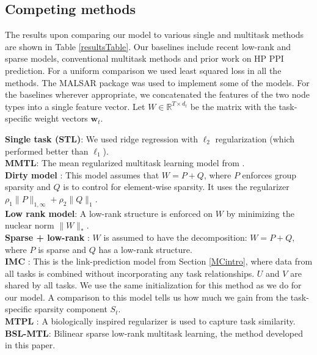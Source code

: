\documentclass[runningheads,a4paper]{llncs}
\begin{document}
\subsection{Competing methods}
The results upon comparing our model to various single and multitask methods are shown in Table \ref{resultsTable}. Our baselines include recent low-rank and sparse models, conventional multitask methods and prior work on HP PPI prediction. For a uniform comparison we used least squared loss in all the methods. The MALSAR package was used to implement some of the models. For the baselines wherever appropriate, we concatenated the features of the two node types into a single feature vector. Let $W \in \mathbb{R}^{T \times d_t}$ be the matrix with the task-specific weight vectors $\mathbf{w}_t$.
 
\noindent\textbf{Single task (STL)}: We used ridge regression with $\ell_2$ regularization (which performed better than $\ell_1$). \\
\noindent\textbf{MMTL}: The mean regularized multitask learning model from \cite{pontil04}. \\
\noindent\textbf{Dirty model} \citep{jalali2010}: This model assumes that $W = P + Q$, where $P$ enforces group sparsity and $Q$ is to control for element-wise sparsity. It uses the regularizer $\rho_1 \|P\|_{1,\infty} + \rho_2 \| Q \|_1$. \\
\noindent\textbf{Low rank model}: A low-rank structure is enforced on $W$ by minimizing the nuclear norm $\|W\|_*$. \\
\noindent\textbf{Sparse + low-rank} \citep{chen2012}: $W$ is assumed to have the decomposition: $W = P + Q$, where $P$ is sparse and $Q$ has a low-rank structure. \\
\noindent\textbf{IMC} \citep{prateek,nagarajan}: This is the link-prediction model from Section \ref{MCintro}, where data from all tasks is combined without incorporating any task relationships. $U$ and $V$ are shared by all tasks. We use the same initialization for this method as we do for our model. A comparison to this model tells us how much we gain from the task-specific sparsity component $S_t$. \\
\noindent\textbf{MTPL} \citep{me_ismb_2013}: A biologically inspired regularizer is used to capture task similarity.\\ \noindent\textbf{BSL-MTL}: Bilinear sparse low-rank multitask learning, the method developed in this paper.
\end{document}

